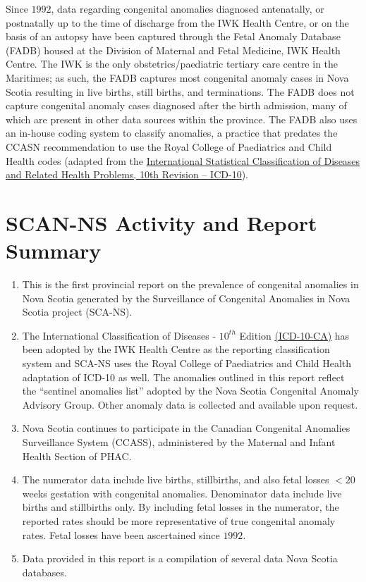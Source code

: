 \documentclass[
]{krantz}
\begin{document}
Since \(1992\), data regarding congenital anomalies diagnosed antenatally, or postnatally up to the time of discharge from the IWK Health Centre, or on the basis of an autopsy have been captured through the Fetal Anomaly Database (FADB) housed at the Division of Maternal and Fetal Medicine, IWK Health Centre. The IWK is the only obstetrics/paediatric tertiary care centre in the Maritimes; as such, the FADB captures most congenital anomaly cases in Nova Scotia resulting in live births, still births, and terminations. The FADB does not capture congenital anomaly cases diagnosed after the birth admission, many of which are present in other data sources within the province. The FADB also uses an in-house coding system to classify anomalies, a practice that predates the CCASN recommendation to use the Royal College of Paediatrics and Child Health codes (adapted from the \href{https://www.google.ca/url?sa=t\&rct=j\&q=\&esrc=s\&source=web\&cd=\&ved=2ahUKEwi9rdLH6pT7AhU2kIkEHUtrDgIQFnoECBgQAQ\&url=https\%3A\%2F\%2Fapps.who.int\%2Firis\%2Fbitstream\%2Fhandle\%2F10665\%2F246208\%2F9789241549165-V1-eng.pdf\&usg=AOvVaw1TYOJuoOf2vUt7kCVsCziR}{International Statistical Classification of Diseases and Related Health Problems, 10th Revision -- ICD-10}).

\hypertarget{scan-ns-activity-and-report-summary}{%
\chapter*{SCAN-NS Activity and Report Summary}\label{scan-ns-activity-and-report-summary}}


\begin{enumerate}
\def\labelenumi{\arabic{enumi}.}
\item
  This is the first provincial report on the prevalence of congenital anomalies in Nova Scotia generated by the Surveillance of Congenital Anomalies in Nova Scotia project (SCA-NS).
\item
  The International Classification of Diseases - \(10^{th}\) Edition \href{https://secure.cihi.ca/estore/productSeries.htm?pc=PCC189}{(ICD-10-CA)} has been adopted by the IWK Health Centre as the reporting classification system and SCA-NS uses the Royal College of Paediatrics and Child Health adaptation of ICD-10 as well. The anomalies outlined in this report reflect the ``sentinel anomalies list'' adopted by the Nova Scotia Congenital Anomaly Advisory Group. Other anomaly data is collected and available upon request.
\item
  Nova Scotia continues to participate in the Canadian Congenital Anomalies Surveillance System (CCASS), administered by the Maternal and Infant Health Section of PHAC.
\item
  The numerator data include live births, stillbirths, and also fetal losses \(< 20\) weeks gestation with congenital anomalies. Denominator data include live births and stillbirths only. By including fetal losses in the numerator, the reported rates should be more representative of true congenital anomaly rates. Fetal losses have been ascertained since \(1992\).
\item
  Data provided in this report is a compilation of several data Nova Scotia databases.
\end{enumerate}
\end{document}
